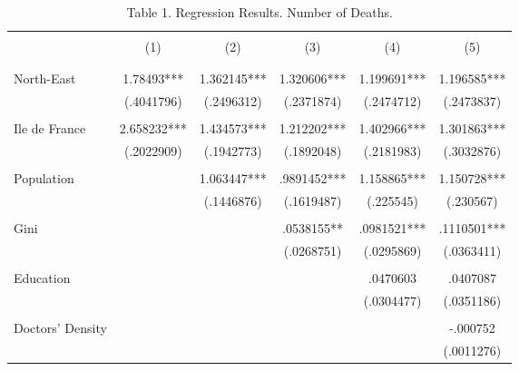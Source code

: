 \documentclass[a4paper]{article}
\theoremstyle{plain}
\theoremstyle{definition}
\begin{document}
\begin{table}[htbp]\centering
\def\sym#1{\ifmmode^{#1}\else\(^{#1}\)\fi}
\caption*{Table 1. Regression Results. Number of Deaths. \label{tab1}}
\begin{tabular}{l*{5}{c}}
\hline\hline
\\
                &\multicolumn{1}{c}{(1)}&\multicolumn{1}{c}{(2)}&\multicolumn{1}{c}{(3)}&\multicolumn{1}{c}{(4)}&\multicolumn{1}{c}{(5)}\\
                &\multicolumn{1}{c}{}&\multicolumn{1}{c}{}&\multicolumn{1}{c}{}&\multicolumn{1}{c}{}&\multicolumn{1}{c}{}\\
\hline
\\
North-East            &     1.78493***&    1.362145***&    1.320606***&    1.199691***&    1.196585***\\
                &  (.4041796)   &  (.2496312)   &  (.2371874)   &  (.2474712)   &  (.2473837)   \\
                \\
Ile de France           &    2.658232***&    1.434573***&    1.212202***&    1.402966***&    1.301863***\\
                &  (.2022909)   &  (.1942773)   &  (.1892048)   &  (.2181983)   &  (.3032876)   \\
                \\
Population  &               &    1.063447***&    .9891452***&    1.158865***&    1.150728***\\
                &               &  (.1446876)   &  (.1619487)   &   (.225545)   &   (.230567)   \\
                \\
Gini            &               &               &    .0538155** &    .0981521***&    .1110501***\\
                &               &               &  (.0268751)   &  (.0295869)   &  (.0363411)   \\
                \\
Education            &               &               &               &    .0470603   &    .0407087   \\
                &               &               &               &  (.0304477)   &  (.0351186)   \\
                \\
Doctors' Density &               &               &               &               &    -.000752   \\
                &               &               &               &               &  (.0011276)   \\

\end{tabular}
\end{table}
\end{document}
